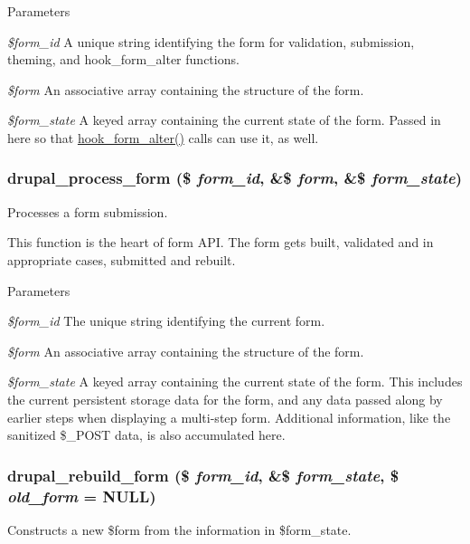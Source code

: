 \begin{DoxyParams}{Parameters}
\item[{\em \$form\_\-id}]A unique string identifying the form for validation, submission, theming, and hook\_\-form\_\-alter functions. \item[{\em \$form}]An associative array containing the structure of the form. \item[{\em \$form\_\-state}]A keyed array containing the current state of the form. Passed in here so that \hyperlink{group__hooks_ga6df3cea27ae1407aeef4eae5444cb213}{hook\_\-form\_\-alter()} calls can use it, as well. \end{DoxyParams}
\hypertarget{group__form__api_ga61186f5c43533761544a778918818fd2}{
\subsubsection[{drupal\_\-process\_\-form}]{\setlength{\rightskip}{0pt plus 5cm}drupal\_\-process\_\-form (\$ {\em form\_\-id}, \/  \&\$ {\em form}, \/  \&\$ {\em form\_\-state})}}
\label{group__form__api_ga61186f5c43533761544a778918818fd2}
Processes a form submission.

This function is the heart of form API. The form gets built, validated and in appropriate cases, submitted and rebuilt.


\begin{DoxyParams}{Parameters}
\item[{\em \$form\_\-id}]The unique string identifying the current form. \item[{\em \$form}]An associative array containing the structure of the form. \item[{\em \$form\_\-state}]A keyed array containing the current state of the form. This includes the current persistent storage data for the form, and any data passed along by earlier steps when displaying a multi-\/step form. Additional information, like the sanitized \$\_\-POST data, is also accumulated here. \end{DoxyParams}
\hypertarget{group__form__api_ga72bc81db2eb72bbb1249a7c50d8614e7}{
\subsubsection[{drupal\_\-rebuild\_\-form}]{\setlength{\rightskip}{0pt plus 5cm}drupal\_\-rebuild\_\-form (\$ {\em form\_\-id}, \/  \&\$ {\em form\_\-state}, \/  \$ {\em old\_\-form} = {\ttfamily NULL})}}
\label{group__form__api_ga72bc81db2eb72bbb1249a7c50d8614e7}
Constructs a new \$form from the information in \$form\_\-state.

